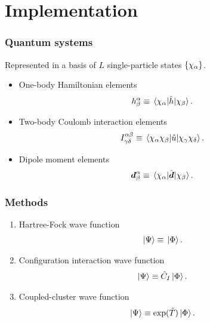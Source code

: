 \documentclass{beamer}
\begin{document}
\section{Implementation}

\begin{frame}
    \frametitle{Quantum systems}
    Represented in a basis of $L$ single-particle states $\left\{ \chi_{\alpha} \right\}$.
    \begin{itemize}
        \item One-body Hamiltonian elements
            \begin{align}
                h^{\alpha}_{\beta}
                \equiv \mel*{\chi_{\alpha}}{\hat{h}}{\chi_{\beta}}.
            \end{align}
        \item Two-body Coulomb interaction elements
            \begin{align}
                I^{\alpha\beta}_{\gamma\delta}
                \equiv
                \mel*{\chi_{\alpha}\chi_{\beta}}{
                    \hat{u}
                }{\chi_{\gamma}\chi_{\delta}}.
            \end{align}
        \item Dipole moment elements
            \begin{align}
                \boldsymbol{d}^{\alpha}_{\beta}
                \equiv
                \mel*{\chi_{\alpha}}{\hat{\boldsymbol{d}}}{\chi_{\beta}}.
            \end{align}
    \end{itemize}
\end{frame}

\begin{frame}
    \frametitle{Methods}
    \begin{enumerate}
        \item Hartree-Fock wave function
            \begin{align}
                \ket*{\Psi} \equiv \ket*{\Phi}.
            \end{align}
        \item Configuration interaction wave function
            \begin{align}
                \ket*{\Psi} \equiv \hat{C}_{I}\ket*{\Phi}.
            \end{align}
        \item Coupled-cluster wave function
            \begin{align}
                \ket*{\Psi} \equiv \exponential(\clust)\ket*{\slat}.
            \end{align}
    \end{enumerate}
\end{frame}
\end{document}
